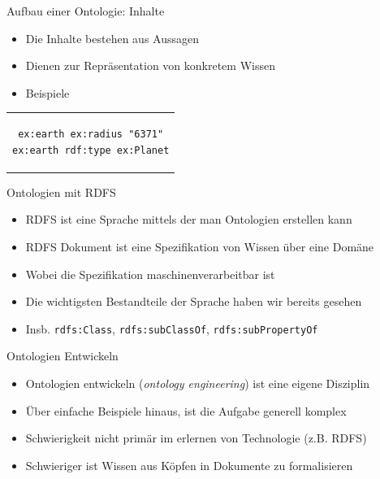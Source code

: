 \documentclass{beamer}
\begin{document}
\begin{frame}[fragile]{Aufbau einer Ontologie: Inhalte}
	
	\begin{itemize}
		\item Die Inhalte bestehen aus Aussagen
		\item Dienen zur Repräsentation von konkretem Wissen
		\item Beispiele
	\end{itemize}	
	
	\begin{center}
		\begin{tabular}{c}
			\begin{lstlisting}
ex:earth ex:radius "6371"
ex:earth rdf:type ex:Planet
			\end{lstlisting}
		\end{tabular}
	\end{center}	
	
\end{frame}

\begin{frame}{Ontologien mit RDFS}
	
	\begin{itemize}
		\item RDFS ist eine Sprache mittels der man Ontologien erstellen kann
		\item RDFS Dokument ist eine Spezifikation von Wissen über eine Domäne
		\item Wobei die Spezifikation maschinenverarbeitbar ist
		\item Die wichtigsten Bestandteile der Sprache haben wir bereits gesehen
		\item Insb. \texttt{rdfs:Class}, \texttt{rdfs:subClassOf}, \texttt{rdfs:subPropertyOf}
	\end{itemize}
	
\end{frame}

\begin{frame}{Ontologien Entwickeln}
	
	\begin{itemize}
		\item Ontologien entwickeln (\emph{ontology engineering}) ist eine eigene Disziplin
		\item Über einfache Beispiele hinaus, ist die Aufgabe generell komplex
		\item Schwierigkeit nicht primär im erlernen von Technologie (z.B. RDFS)
		\item Schwieriger ist Wissen aus Köpfen in Dokumente zu formalisieren
	\end{itemize}
	
\end{frame}
\end{document}
